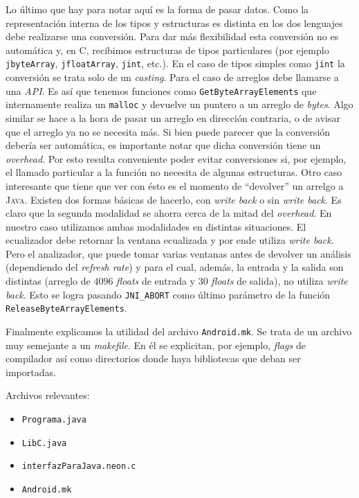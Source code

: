 \documentclass[%
    compressed,
    titlepage,
    narroweqnarray,
    inline,
    twoside,
    ]{ieee}
\begin{document}
Lo \'ultimo que hay para notar aqu\'i es la forma de pasar datos. Como la representaci\'on interna de los tipos y estructuras es distinta en los
dos lenguajes debe realizarse una conversi\'on. Para dar m\'as flexibilidad esta conversi\'on no es autom\'atica y, en \textsc{C}, recibimos
estructuras de tipos particulares (por ejemplo \texttt{jbyteArray}, \texttt{jfloatArray}, \texttt{jint}, etc.). En el caso de tipos simples como
\texttt{jint} la conversi\'on se trata solo de un \textit{casting}. Para el caso de arreglos debe llamarse a una \textit{API}. Es as\'i que tenemos
funciones como \texttt{GetByteArrayElements} que internamente realiza un \texttt{malloc} y devuelve un puntero a un arreglo de \textit{bytes}.
Algo similar se hace a la hora de pasar un arreglo en direcci\'on contraria, o de avisar que el arreglo ya no se necesita m\'as.
Si bien puede parecer que la conversi\'on deber\'ia ser autom\'atica, es importante notar que dicha conversi\'on tiene un \textit{overhead}. Por esto
resulta conveniente poder evitar conversiones si, por ejemplo, el llamado particular a la funci\'on no necesita de algunas estructuras.
Otro caso interesante que tiene que ver con \'esto es el momento de ``devolver'' un arrelgo a \textsc{Java}.
Existen dos formas b\'asicas de hacerlo, con \textit{write back} o sin \textit{write back}. Es claro que la segunda modalidad se ahorra cerca de la
mitad del \textit{overhead}. En nuestro caso utilizamos ambas modalidades en distintas situaciones. El ecualizador debe retornar la ventana ecualizada
y por ende utiliza \textit{write back}. Pero el analizador, que puede tomar varias ventanas antes de devolver un an\'alisis (dependiendo del
\textit{refresh rate}) y para el cual, adem\'as, la entrada y la salida son distintas (arreglo de $4096$ \textit{floats} de entrada y $30$ \textit{floats} de salida),
no utiliza \textit{write back}. Esto se logra pasando \texttt{JNI\_ABORT} como \'ultimo par\'ametro de la funci\'on \texttt{ReleaseByteArrayElements}.

Finalmente explicamos la utilidad del archivo \texttt{Android.mk}. Se trata de un archivo muy semejante a un \textit{makefile}. En \'el se explicitan,
por ejemplo, \textit{flags} de compilador as\'i como directorios donde haya bibliotecas que deban ser importadas.

Archivos relevantes:
\begin{itemize}
    \item \texttt{Programa.java}
    \item \texttt{LibC.java}
    \item \texttt{interfazParaJava.neon.c}
    \item \texttt{Android.mk}
\end{itemize}
\end{document}
